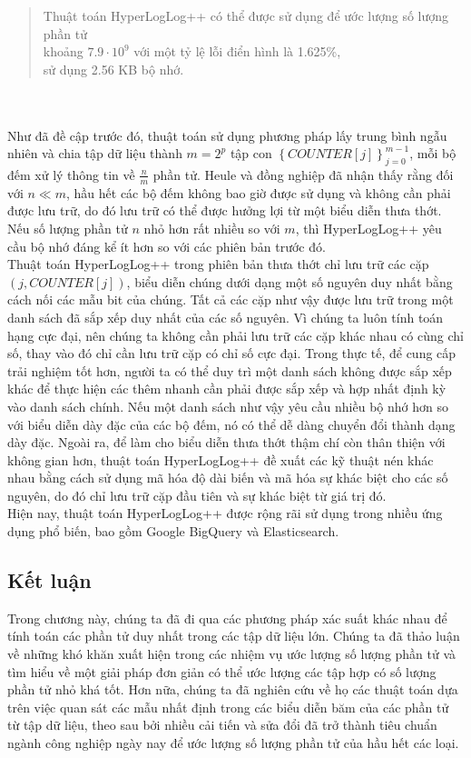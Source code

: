 \documentclass[letterpaper,13pt]{article}
\theoremstyle{mytheor}
\begin{document}
\begin{quote}
    Thuật toán HyperLogLog++ có thể được sử dụng để ước lượng số lượng phần tử \\
    khoảng $7.9 \cdot 10^9$ với một tỷ lệ lỗi điển hình là 1.625\%, \\
    sử dụng 2.56 KB bộ nhớ.
    \vspace{0.25cm}
\end{quote}
\\\\
\indent Như đã đề cập trước đó, thuật toán sử dụng phương pháp lấy trung bình ngẫu nhiên và chia tập dữ liệu thành $m = 2^p$ tập con $\left\{COUNTER[j]\right\}_{j=0}^{m-1}$, 
mỗi bộ đếm xử lý thông tin về $\frac{n}{m}$ phần tử. Heule và đồng nghiệp đã nhận thấy rằng đối với $n \ll m$, hầu hết các bộ đếm không bao giờ được 
sử dụng và không cần phải được lưu trữ, do đó lưu trữ có thể được hưởng lợi từ một biểu diễn thưa thớt. Nếu số lượng phần tử $n$ nhỏ hơn rất nhiều 
so với $m$, thì HyperLogLog++ yêu cầu bộ nhớ đáng kể ít hơn so với các phiên bản trước đó.\\
\indent Thuật toán HyperLogLog++ trong phiên bản thưa thớt chỉ lưu trữ các cặp $(j, COUNTER[j])$, biểu diễn chúng dưới dạng một số nguyên duy nhất 
bằng cách nối các mẫu bit của chúng. Tất cả các cặp như vậy được lưu trữ trong một danh sách đã sắp xếp duy nhất của các số nguyên. 
Vì chúng ta luôn tính toán hạng cực đại, nên chúng ta không cần phải lưu trữ các cặp khác nhau có cùng chỉ số, thay vào đó chỉ cần lưu trữ cặp 
có chỉ số cực đại.
Trong thực tế, để cung cấp trải nghiệm tốt hơn, người ta có thể duy trì một danh sách không được sắp xếp khác để thực hiện các thêm nhanh 
cần phải được sắp xếp và hợp nhất định kỳ vào danh sách chính. Nếu một danh sách như vậy yêu cầu nhiều bộ nhớ hơn so với biểu diễn dày đặc 
của các bộ đếm, nó có thể dễ dàng chuyển đổi thành dạng dày đặc. Ngoài ra, để làm cho biểu diễn thưa thớt thậm chí còn thân thiện với không gian hơn, 
thuật toán HyperLogLog++ đề xuất các kỹ thuật nén khác nhau bằng cách sử dụng mã hóa độ dài biến và mã hóa sự khác biệt cho các số nguyên, 
do đó chỉ lưu trữ cặp đầu tiên và sự khác biệt từ giá trị đó.\\
\indent Hiện nay, thuật toán HyperLogLog++ được rộng rãi sử dụng trong nhiều ứng dụng phổ biến, bao gồm Google BigQuery và Elasticsearch.
\subsection*{Kết luận}
Trong chương này, chúng ta đã đi qua các phương pháp xác suất khác nhau để tính toán các phần tử duy nhất trong các tập dữ liệu lớn. 
Chúng ta đã thảo luận về những khó khăn xuất hiện trong các nhiệm vụ ước lượng số lượng phần tử và tìm hiểu về một giải pháp đơn giản có thể ước lượng 
các tập hợp có số lượng phần tử nhỏ khá tốt. Hơn nữa, chúng ta đã nghiên cứu về họ các thuật toán dựa trên việc quan sát các mẫu nhất định trong 
các biểu diễn băm của các phần tử từ tập dữ liệu, theo sau bởi nhiều cải tiến và sửa đổi đã trở thành tiêu chuẩn ngành công nghiệp ngày nay để 
ước lượng số lượng phần tử của hầu hết các loại.\\
\end{document}
